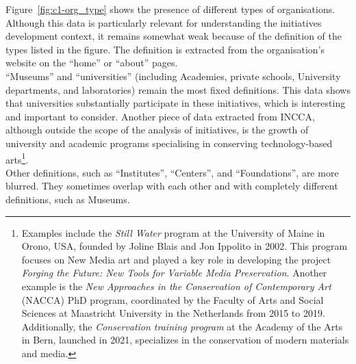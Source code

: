 Figure~\ref{fig:c1-org_type} shows the presence of different types of organisations. Although this data is particularly relevant for understanding the initiatives development context, it remains somewhat weak because of the definition of the types listed in the figure. The definition is extracted from the organisation's website on the ``home'' or ``about'' pages.\\
``Museums'' and ``universities'' (including Academies, private schools, University departments, and laboratories) remain the most fixed definitions. This data shows that universities substantially participate in these initiatives, which is interesting and important to consider. Another piece of data extracted from INCCA, although outside the scope of the analysis of initiatives, is the growth of university and academic programs specialising in conserving technology-based arts\footnote{Examples include the \textit{Still Water} program at the University of Maine in Orono, USA, founded by Joline Blais and Jon Ippolito in 2002. This program focuses on New Media art and played a key role in developing the project \textit{Forging the Future: New Tools for Variable Media Preservation}. Another example is the \textit{New Approaches in the Conservation of Contemporary Art} (NACCA) PhD program, coordinated by the Faculty of Arts and Social Sciences at Maastricht University in the Netherlands from 2015 to 2019. Additionally, the \textit{Conservation training program} at the Academy of the Arts in Bern, launched in 2021, specializes in the conservation of modern materials and media.}.\\
Other definitions, such as ``Institutes'', ``Centers'', and ``Foundations'', are more blurred. They sometimes overlap with each other and with completely different definitions, such as Museums.\\

